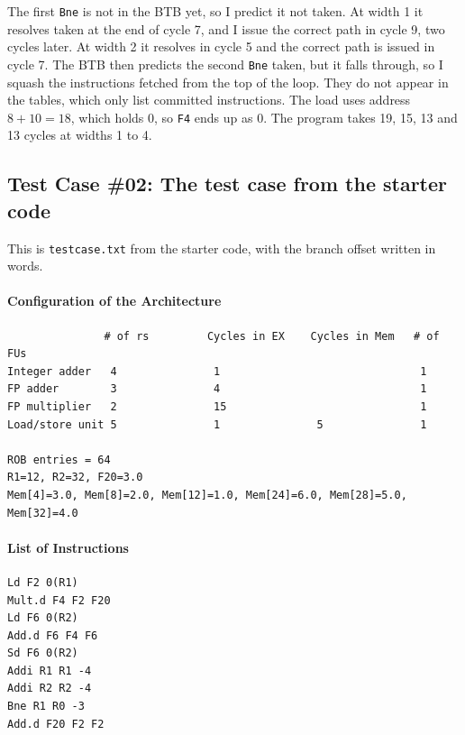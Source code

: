 \documentclass[11pt]{article}
\renewcommand{\_}{\origunderscore\allowbreak}
\begin{document}
The first \texttt{Bne} is not in the BTB yet, so I predict it not taken. At width 1 it
resolves taken at the end of cycle 7, and I issue the correct path in cycle 9, two cycles later.
At width 2 it resolves in cycle 5 and the correct path is issued in cycle 7. The BTB then
predicts the second \texttt{Bne} taken, but it falls through, so I squash the instructions
fetched from the top of the loop. They do not appear in the tables, which only list committed
instructions. The load uses address $8 + 10 = 18$, which holds 0, so \texttt{F4} ends up as 0.
The program takes 19, 15, 13
and 13 cycles at widths 1 to 4.

\subsection{Test Case \#02: The test case from the starter code}

This is \texttt{test\_case.txt} from the starter code, with the branch offset written in words.

\paragraph{Configuration of the Architecture}
\begin{verbatim}
               # of rs         Cycles in EX    Cycles in Mem   # of FUs
Integer adder   4               1                               1
FP adder        3               4                               1
FP multiplier   2               15                              1
Load/store unit 5               1               5               1

ROB entries = 64
R1=12, R2=32, F20=3.0
Mem[4]=3.0, Mem[8]=2.0, Mem[12]=1.0, Mem[24]=6.0, Mem[28]=5.0, Mem[32]=4.0
\end{verbatim}

\paragraph{List of Instructions}
\begin{verbatim}
Ld F2 0(R1)
Mult.d F4 F2 F20
Ld F6 0(R2)
Add.d F6 F4 F6
Sd F6 0(R2)
Addi R1 R1 -4
Addi R2 R2 -4
Bne R1 R0 -3
Add.d F20 F2 F2
\end{verbatim}
\end{document}
